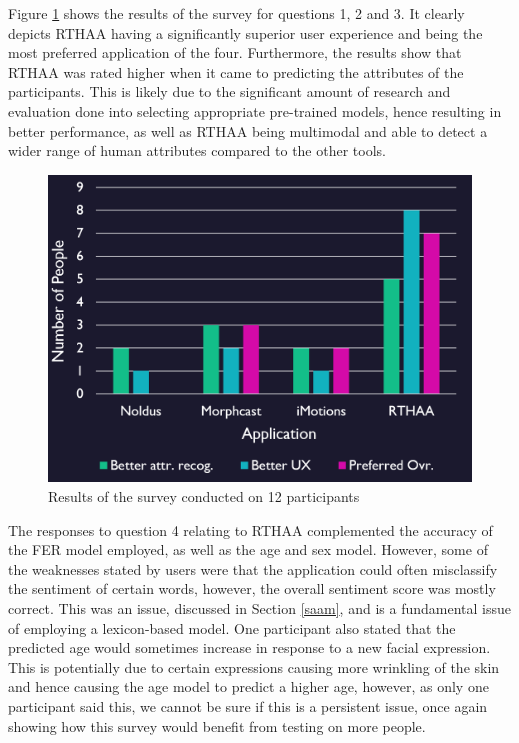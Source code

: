 \documentclass[12pt, a4paper]{article}
\begin{document}
Figure \ref{fig:survey} shows the results of the survey for questions 1, 2 and 3. It clearly depicts RTHAA having a significantly superior user experience and being the most preferred application of the four. Furthermore, the results show that RTHAA was rated higher when it came to predicting the attributes of the participants. This is likely due to the significant amount of research and evaluation done into selecting appropriate pre-trained models, hence resulting in better performance, as well as RTHAA being multimodal and able to detect a wider range of human attributes compared to the other tools. 

\begin{figure}[H]
    \centering
    \includegraphics[scale=0.50]{images/survey.png}
    \caption{Results of the survey conducted on 12 participants}
    \label{fig:survey}
\end{figure}

The responses to question 4 relating to RTHAA complemented the accuracy of the FER model employed, as well as the age and sex model. However, some of the weaknesses stated by users were that the application could often misclassify the sentiment of certain words, however, the overall sentiment score was mostly correct. This was an issue, discussed in Section \ref{saam}, and is a fundamental issue of employing a lexicon-based model. One participant also stated that the predicted age would sometimes increase in response to a new facial expression. This is potentially due to certain expressions causing more wrinkling of the skin and hence causing the age model to predict a higher age, however, as only one participant said this, we cannot be sure if this is a persistent issue, once again showing how this survey would benefit from testing on more people. 
\end{document}

